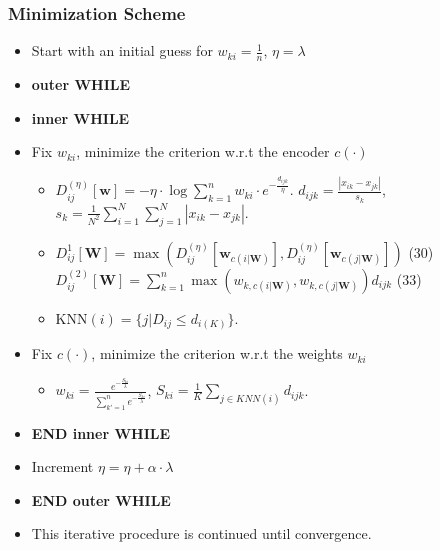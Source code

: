 \documentclass{beamer}
\begin{document}
\begin{frame}
\frametitle{Minimization Scheme}


\begin{itemize}
\item Start with an initial guess for $w_{ki}=\frac{1}{n}$, $\eta=\lambda$
\item \textbf{outer WHILE}
     \item \textbf{inner WHILE}
\item Fix $w_{ki}$, minimize the criterion w.r.t the encoder $c(\cdot)$
  \begin{itemize}
  \item $D^{(\eta)}_{ij}[\textbf{w}]=-\eta \cdot \log \sum^{n}_{k=1}w_{ki} \cdot e^{-\frac{d_{ijk}}{\eta}}$.
  $d_{ijk}=\frac{|x_{ik}-x_{jk}|}{s_k}$,~~$s_k=\frac{1}{N^2}\sum^N_{i=1}\sum^N_{j=1}|x_{ik}-x_{jk}|$.
  \item $D^{1}_{ij}[\textbf{W}]=\max(D^{(\eta)}_{ij}[\textbf{w}_{c(i|\textbf{W})}],D^{(\eta)}_{ij}[\textbf{w}_{c(j|\textbf{W})}])$ (30) \\
        $D_{ij}^{(2)}[\textbf{W}]=\sum^n_{k=1}\max(w_{k,c(i|\textbf{W})},w_{k,c(j|\textbf{W})})d_{ijk}$ (33)
  \item KNN$(i)=\{j|D_{ij} \leq d_{i(K)}\}$.
  \end{itemize}
\item Fix $c(\cdot)$, minimize the criterion w.r.t the weights $w_{ki}$
  \begin{itemize}
    \item $w_{ki}=\frac{e^{-\frac{S_{ki}}{\lambda}}}{\sum^n_{k'=1}e^{-\frac{S_{ki}}{\lambda}}}$, $S_{ki}=\frac{1}{K}\sum_{j \in KNN(i)}d_{ijk}$.
  \end{itemize}
\item \textbf{END inner WHILE}
\item Increment $\eta=\eta+\alpha \cdot \lambda$
\item \textbf{END outer WHILE}
\item This iterative procedure is continued until convergence.
\end{itemize}
\end{frame}
\end{document}
